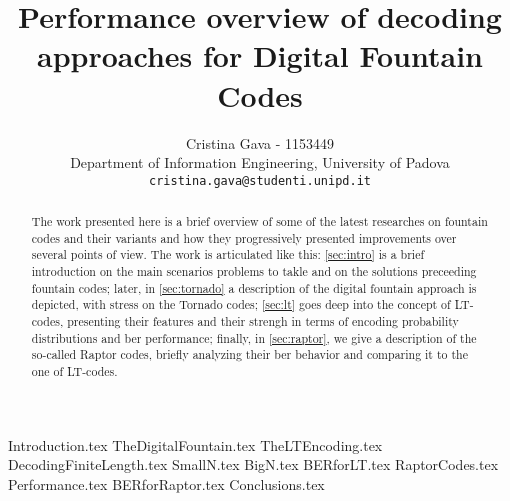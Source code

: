 \documentclass[12pt,a4paper]{article}
\newcommand{\email}[1]{\texttt{#1}}
\begin{document}
\begin{titlingpage}
\title{Performance overview of decoding approaches for Digital Fountain Codes}
\author{Cristina Gava - 1153449\\
Department of Information Engineering, University of Padova\\
\email{cristina.gava@studenti.unipd.it}}
\setlength{\droptitle}{1pt} %
\maketitle
\begin{abstract}
The work presented here is a brief overview of some of the latest researches on fountain codes and their variants and how they progressively presented improvements over several points of view. The work is articulated like this: \autoref{sec:intro} is a brief introduction on the main scenarios problems to takle and on the solutions preceeding fountain codes; later, in \autoref{sec:tornado} a description of the digital fountain approach is depicted, with stress on the Tornado codes; \autoref{sec:lt} goes deep into the concept of LT-codes, presenting their features and their strengh in terms of encoding probability distributions and \gls{ber} performance; finally, in \autoref{sec:raptor}, we give a description of the so-called Raptor codes, briefly analyzing their \gls{ber} behavior and comparing it to the one of LT-codes.
\end{abstract}
\end{titlingpage}

{Introduction.tex}
{TheDigitalFountain.tex}
{TheLTEncoding.tex}
{DecodingFiniteLength.tex}
{SmallN.tex}
{BigN.tex}
{BERforLT.tex}
{RaptorCodes.tex}
{Performance.tex}
{BERforRaptor.tex}
{Conclusions.tex}



\end{document}
